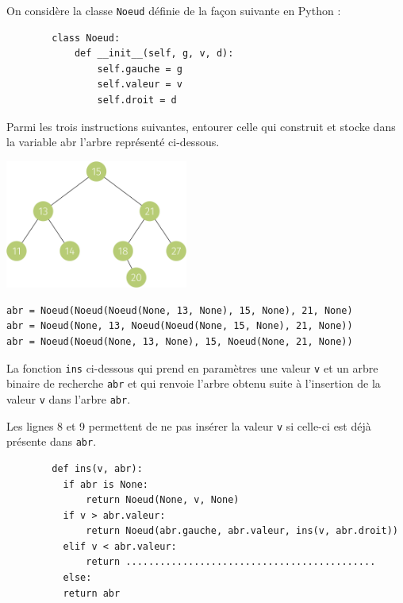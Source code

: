 \documentclass[a4paper,12pt,article,firamath]{nsi}
\begin{document}
On considère la classe \texttt{Noeud} définie de la façon suivante en Python :


\begin{verbatim}
        class Noeud:
            def __init__(self, g, v, d):
                self.gauche = g
                self.valeur = v
                self.droit = d
\end{verbatim}

\question Parmi les trois instructions suivantes, entourer celle qui construit et stocke dans la variable abr l'arbre représenté ci-dessous.
\begin{center}
    \includegraphics[width=6cm]{img/fig1}
\end{center}


\begin{verbatim}
abr = Noeud(Noeud(Noeud(None, 13, None), 15, None), 21, None)
abr = Noeud(None, 13, Noeud(Noeud(None, 15, None), 21, None))
abr = Noeud(Noeud(None, 13, None), 15, Noeud(None, 21, None)) 
\end{verbatim}

La fonction \texttt{ins} ci-dessous qui
prend en paramètres une valeur \texttt{v} et un arbre binaire de recherche \texttt{abr} et qui
renvoie l'arbre obtenu suite à l'insertion de la valeur \texttt{v} dans l'arbre \texttt{abr}.

Les lignes 8 et 9 permettent de ne pas insérer la valeur \texttt{v} si celle-ci est déjà présente dans \texttt{abr}.


    \begin{verbatim}
        def ins(v, abr):
          if abr is None:
              return Noeud(None, v, None)
          if v > abr.valeur:
              return Noeud(abr.gauche, abr.valeur, ins(v, abr.droit))
          elif v < abr.valeur:
              return ............................................
          else:
          return abr      
      \end{verbatim}          
\end{document}
